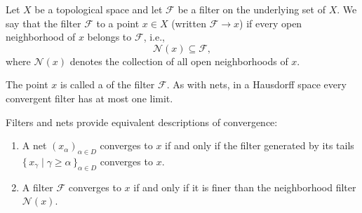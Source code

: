\begin{definition} \label{definition:convergence_of_a_filter_in_a_topological_space}

    Let $X$ be a topological space and let $\mathcal{F}$ be a filter on the underlying set of $X$. We say that the filter $\mathcal{F}$  to a point $x \in X$ (written $\mathcal{F} \to x$) if every open neighborhood of $x$ belongs to $\mathcal{F}$, i.e.,
    $$\mathcal{N}(x) \subseteq \mathcal{F},$$
    where $\mathcal{N}(x)$ denotes the collection of all open neighborhoods of $x$.

    The point $x$ is called a  of the filter $\mathcal{F}$. As with nets, in a Hausdorff space every convergent filter has at most one limit.

    Filters and nets provide equivalent descriptions of convergence:
    \begin{enumerate}
        \item A net $(x_\alpha)_{\alpha \in D}$ converges to $x$ if and only if the filter generated by its tails $\{\, x_\gamma \mid \gamma \geq \alpha \,\}_{\alpha \in D}$ converges to $x$.
        \item A filter $\mathcal{F}$ converges to $x$ if and only if it is finer than the neighborhood filter $\mathcal{N}(x)$.
    \end{enumerate}
\end{definition}
